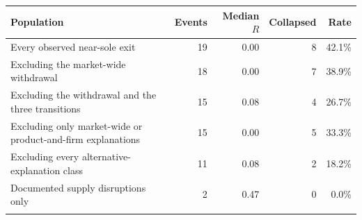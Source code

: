 \begin{tabular}{@{}lrrrr@{}}
\toprule
Population & Events & Median $R$ & Collapsed & Rate \\
\midrule
Every observed near-sole exit & 19 & 0.00 & 8 & 42.1\% \\
Excluding the market-wide withdrawal & 18 & 0.00 & 7 & 38.9\% \\
Excluding the withdrawal and the three transitions & 15 & 0.08 & 4 & 26.7\% \\
Excluding only market-wide or product-and-firm explanations & 15 & 0.00 & 5 & 33.3\% \\
Excluding every alternative-explanation class & 11 & 0.08 & 2 & 18.2\% \\
Documented supply disruptions only & 2 & 0.47 & 0 & 0.0\% \\
\botrule
\end{tabular}
